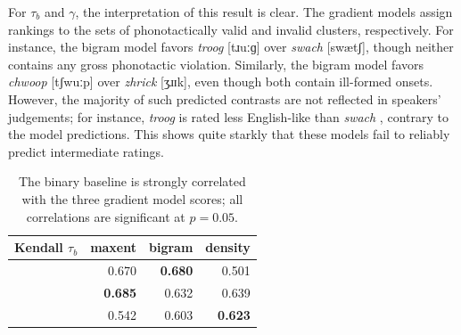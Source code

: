 For $\tau_b$ and $\gamma$, the interpretation of this result is clear. The gradient models assign rankings to the sets of phonotactically valid and invalid clusters, respectively. For instance, the bigram model favors \emph{troog} [tɹuːɡ] over \emph{swach} [swætʃ], though neither contains any gross phonotactic violation. Similarly, the bigram model favors \emph{chwoop} [tʃwuːp] over \emph{zhrick} [ʒɹɪk], even though both contain ill-formed onsets. However, the majority of such predicted contrasts are not reflected in speakers' judgements; for instance, \emph{troog} is rated less English-like than \emph{swach} \citep{Greenberg1964}, contrary to the model predictions. This shows quite starkly that these models fail to reliably predict intermediate ratings.

\begin{table} \centering
\begin{tabular}{l r r r}
\toprule
Kendall $\tau_b$          & maxent         & bigram         & density  \\
\midrule
\citealt{Greenberg1964}   & 0.670          & \textbf{0.680} & 0.501 \\
\citealt{Scholes1966}     & \textbf{0.685} & 0.632          & 0.639 \\
\citealt{Albright2003b}   & 0.542          & 0.603          & \textbf{0.623} \\
\bottomrule
\end{tabular}
\caption{The binary baseline is strongly correlated with the three gradient model scores; all correlations are significant at $p = 0.05$.}
\label{bcor}
\end{table}

